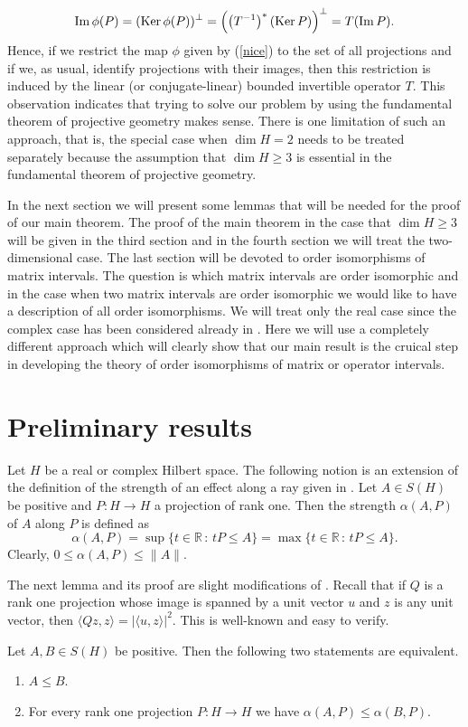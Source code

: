 \documentclass{article}
\begin{document}
\begin{equation}\label{fiesa}
{\rm Im}\, \phi (P) = ({\rm Ker}\, \phi (P))^\perp = \left( \left( T^{-1} \right)^\ast ({\rm Ker}\, P) \right)^\perp = T({\rm Im}\, P).
\end{equation}
Hence, if we restrict the map $\phi$ given by (\ref{nice}) to the set of all projections and if we, as usual, identify projections with their images, then this restriction is induced by the linear (or conjugate-linear) bounded invertible operator $T$. This observation indicates that trying to solve our problem by using the fundamental theorem of projective geometry makes sense. 
There is one limitation of such an approach, that is, the special case when $\dim H = 2$ needs to be treated separately because the assumption that $\dim H \ge 3$ is essential in the fundamental theorem of projective geometry.

In the next section we will present some lemmas that will be needed for the proof of our main theorem. The proof of the main theorem in the case that $\dim H \ge 3$ will be given in the third section and in the fourth section we will treat  the two-dimensional case. The last section will be devoted to order isomorphisms of matrix intervals. The question is which matrix intervals are order isomorphic and in the case when two matrix intervals are order isomorphic we would like to have a description of all order isomorphisms. We will treat only the real case since the complex case has been considered already in \cite{Se6}. Here we will use a completely different approach which will clearly show that our main result is the cruical step in developing the theory of order isomorphisms of matrix or operator intervals.

\section{Preliminary results}

Let $H$ be a real or complex Hilbert space. The following notion is an extension of the definition of the strength of an effect along a ray given in \cite{BG}. Let $A \in S(H)$ be positive and $P: H \to H$ a projection of rank one. Then the strength $\alpha (A,P)$ of $A$ along $P$ is defined as
$$
\alpha (A,P) = \sup \{  t \in \mathbb{R} \,  : \, tP \le A \} = \max \{ t \in \mathbb{R} \, : \, tP \le A \}.
$$
Clearly, $0 \le \alpha (A,P) \le \| A \|$. 

The next lemma and its proof are slight modifications of \cite[Theorem 1]{BG}. Recall that if $Q$ is a rank one projection whose image is spanned by a unit vector $u$ and $z$ is any unit vector, then $\langle Qz,z \rangle = | \langle u,z \rangle |^2$. This is well-known and easy to verify.
\begin{lemma}\label{less}
Let $A,B \in S(H)$ be positive. Then the following two statements are equivalent.
\begin{enumerate}
\item $A \le B$.
\item For every rank one projection $P : H \to H$ we have $\alpha (A,P) \le \alpha (B,P)$.
\end{enumerate}
\end{lemma}
\end{document}
